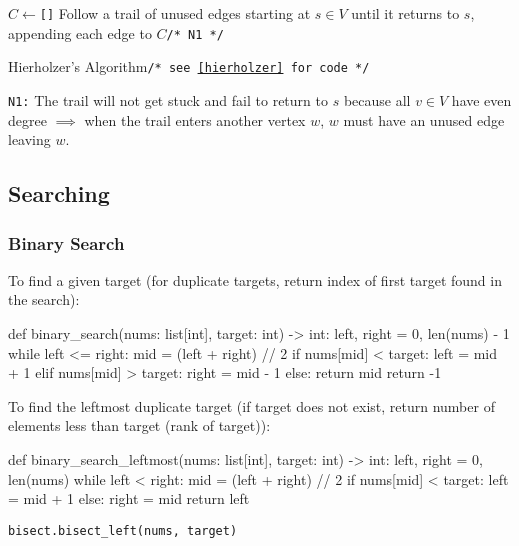 \documentclass[12pt, titlepage]{article}
\begin{document}
\begin{algorithm}[H]
  \SetAlgoLined
  \DontPrintSemicolon
  $C \longleftarrow$\hspace{0.5mm}\texttt{[]}\;
  Follow a trail of unused edges starting at $s \in V$ until it returns to $s$, appending each edge to $C$\hspace{58mm}\texttt{/* N1 */}\;
  \;
  \caption{Hierholzer's Algorithm\hspace{5mm}\texttt{/* see \ref{hierholzer} for code */}}
\end{algorithm} \medskip

\texttt{N1:} The trail will not get stuck and fail to return to $s$ because all $v \in V$ have even degree $\implies$ when the trail enters another vertex $w$, $w$ must have an unused edge leaving $w$.

\subsection{Searching}

\subsubsection{Binary Search}
To find a given target (for duplicate targets, return index of first target found in the search):
\begin{python}
def binary_search(nums: list[int], target: int) -> int:
    left, right = 0, len(nums) - 1
    while left <= right:
        mid = (left + right) // 2
        if nums[mid] < target:
            left = mid + 1
        elif nums[mid] > target:
            right = mid - 1
        else:
            return mid
    return -1
\end{python}
\bigskip

To find the leftmost duplicate target (if target does not exist, return number of elements less than target (rank of target)):
\begin{python}
def binary_search_leftmost(nums: list[int], target: int) -> int:
    left, right = 0, len(nums)
    while left < right:
        mid = (left + right) // 2
        if nums[mid] < target:
            left = mid + 1
        else:
            right = mid
    return left
\end{python}
\texttt{bisect.bisect\_left(nums, target)} \\
\end{document}
